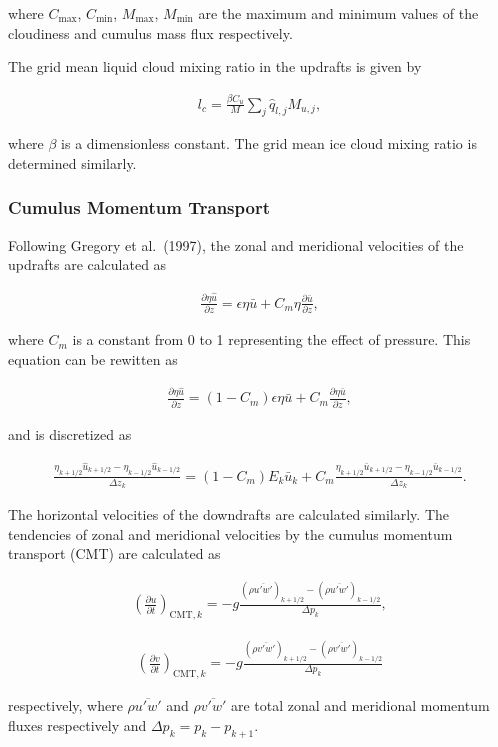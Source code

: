 where \(C_\mathrm{max}\), \(C_\mathrm{min}\), \(M_\mathrm{max}\),
\(M_\mathrm{min}\) are the maximum and minimum values of the cloudiness
and cumulus mass flux respectively.

The grid mean liquid cloud mixing ratio in the updrafts is given by

\begin{eqnarray}
 l_c = \frac{\beta C_u}{M} \sum_j \hat{q}_{l,j} M_{u,j},
\end{eqnarray}

where \(\beta\) is a dimensionless constant. The grid mean ice cloud
mixing ratio is determined similarly.

\hypertarget{cumulus-momentum-transport}{%
\subsubsection{Cumulus Momentum
Transport}\label{cumulus-momentum-transport}}

Following Gregory et al.~(1997), the zonal and meridional velocities of
the updrafts are calculated as

\begin{eqnarray}
 \frac{\partial \eta \hat{u}}{\partial z} = \epsilon \eta \bar{u} + C_m \eta \frac{\partial \bar{u}}{\partial z},
\end{eqnarray}

where \(C_m\) is a constant from 0 to 1 representing the effect of
pressure. This equation can be rewitten as

\begin{eqnarray}
 \frac{\partial \eta \hat{u}}{\partial z} = (1-C_m) \epsilon \eta \bar{u} + C_m \frac{\partial \eta \bar{u}}{\partial z},
\end{eqnarray}

and is discretized as

\begin{eqnarray}
  \frac{\eta_{k+1/2} \hat{u}_{k+1/2} - \eta_{k-1/2} \hat{u}_{k-1/2}}{\Delta z_k} = (1-C_m) E_k \bar{u}_k
          + C_m \frac{\eta_{k+1/2} \bar{u}_{k+1/2} - \eta_{k-1/2} \bar{u}_{k-1/2}}{\Delta z_k}.
\end{eqnarray}

The horizontal velocities of the downdrafts are calculated similarly.
The tendencies of zonal and meridional velocities by the cumulus
momentum transport (CMT) are calculated as

\begin{eqnarray}
 \left(\frac{\partial u}{\partial t}\right)_{\mathrm{CMT},k} = -g\frac{(\rho\overline{u'w'})_{k+1/2} - (\rho\overline{u'w'})_{k-1/2}}{\Delta p_k},
\end{eqnarray}

\begin{eqnarray}
 \left(\frac{\partial v}{\partial t}\right)_{\mathrm{CMT},k} = -g\frac{(\rho\overline{v'w'})_{k+1/2} - (\rho\overline{v'w'})_{k-1/2}}{\Delta p_k}
\end{eqnarray}

respectively, where \(\rho\overline{u'w'}\) and \(\rho\overline{v'w'}\)
are total zonal and meridional momentum fluxes respectively and
\(\Delta p_k = p_k - p_{k+1}\).
